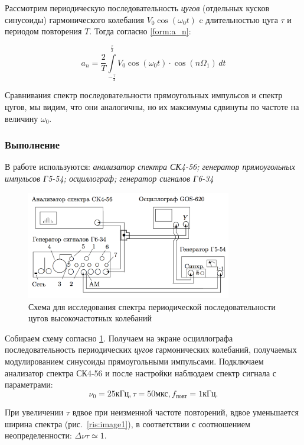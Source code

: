 \documentclass[a4paper, 12pt,twoside]{article}
\begin{document}
Рассмотрим периодическую последовательность {\it{цугов}} (отдельных кусков синусоиды) гармонического колебания
$V_0 \cos (\omega_0 t)$ c длительностью цуга $\tau$ и периодом повторения $T$.
Тогда согласно \ref{form:a_n}:

\begin{equation}
\label{form:cug_a_n}
a_n = \frac{2}{T}\int\limits_{ -\frac{\tau}{2} } ^ {\frac{\tau}{2} } V_0\cos(\omega_0t)\cdot \cos(n\Omega_1)\, dt
\end{equation}

Сравнивания спектр последовательности прямоугольных импульсов и спектр цугов, мы видим, что они аналогичны, но их максимумы сдвинуты по частоте на величину $\omega_{0}$.

\subsubsection*{Выполнение}

В работе используются: \textit{анализатор спектра СК4-56; генератор прямоугольных импульсов Г5-54; осциллограф; генератор сигналов Г6-34}

\begin{figure}[H]
\centering
\includegraphics[width = 0.8\textwidth]{schemeB}
\caption{Схема для исследования спектра периодической последовательности цугов высокочастотных колебаний}
\label{img:scheme B}
\end{figure}

Собираем схему согласно \ref{img:scheme B}. Получаем на экране осциллографа последовательность периодических {\it{цугов}} гармонических колебаний, получаемых модулированием синусоиды прямоугольными импульсами. Подключаем анализатор спектра СК4-56 и после настройки наблюдаем спектр сигнала с параметрами: $$\nu_{0} = 25\text{кГц}, \tau = 50\text{мкс}, f_{\text{повт}} = 1\text{кГц}.$$




При увеличении $\tau$ вдвое при неизменной частоте повторений, вдвое уменьшается ширина спектра (рис.~\ref{ris:image1}), в соответствии с соотношением неопределенности: $\Delta \nu \tau \simeq 1$.
\end{document}
